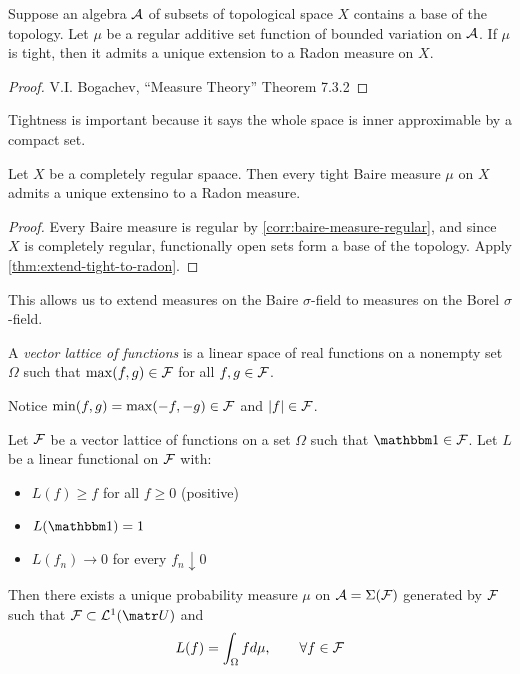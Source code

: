 
\begin{theorem}
  \label{thm:extend-tight-to-radon}
  Suppose an algebra $\mathcal{A}$ of subsets of topological space $X$
  contains a base of the topology.
  Let $\mu$ be a regular additive set function of bounded variation on $\mathcal{A}$.
  If $\mu$ is tight, then it admits a unique extension to a Radon measure on
  $X$.
\end{theorem}

\begin{proof}
  V.I. Bogachev, ``Measure Theory'' Theorem 7.3.2
\end{proof}

Tightness is important because it says the whole space is inner approximable by
a compact set.

\begin{corollary}
  Let $X$ be a completely regular spaace.
  Then every tight Baire measure $\mu$ on $X$
  admits a unique extensino to a Radon measure.
\end{corollary}

\begin{proof}
  Every Baire measure is regular by \cref{corr:baire-measure-regular},
  and since $X$ is completely regular, functionally open sets form a
  base of the topology. Apply \cref{thm:extend-tight-to-radon}.
\end{proof}

This allows us to extend measures on the Baire $\sigma$-field to measures
on the Borel $\sigma$-field.

\begin{definition}
  A \emph{vector lattice of functions} is a linear space of
  real functions on a nonempty set $\Omega$ such that
  $\max(f,g) \in \mathcal{F}$ for all $f,g \in \mathcal{F}$.

  Notice $\min(f,g) = \max(-f,-g) \in \mathcal{F}$ and $\lvert f \rvert \in \mathcal{F}$.
\end{definition}

\begin{theorem}
  \label{thm:daniell-integration}
  Let $\mathcal{F}$ be a vector lattice of functions on a set $\Omega$
  such that $\ind \in \cF$.
  Let $L$ be a linear functional on $\mathcal{F}$ with:
  \begin{itemize}
    \item $L(f) \geq f$ for all $f \geq 0$ (positive)
    \item $L(\ind) = 1$
    \item $L(f_n) \to 0$ for every $f_n \downarrow 0$
  \end{itemize}
  Then there exists a unique probability measure $\mu$ on
  $\mathcal{A} = \Sigma(\mathcal{F})$ generated by $\mathcal{F}$ such that
  $\cF \subset \cL^1(\mU)$ and
  \[
    L(f) = \int_\Omega f d\mu,\qquad \forall f \in \mathcal{F}
  \]
\end{theorem}

